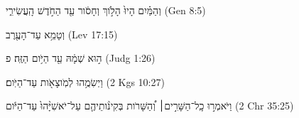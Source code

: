 
\begin{exe}

\ex\label{antdur_defdem_exs1}
\texthebrew{
וְהַמַּ֗יִם הָיוּ֙ הָלֹ֣וךְ וְחָסֹ֔ור עַ֖ד הַחֹ֣דֶשׁ הָֽעֲשִׂירִ֑י 
} (Gen 8:5)

\ex\label{antdur_defdem_exs2}
\texthebrew{
וְטָמֵ֥א עַד־הָעֶ֖רֶב 
} (Lev 17:15)

\ex\label{antdur_defdem_exs3}
\texthebrew{
ה֣וּא שְׁמָ֔הּ עַ֖ד הַיֹּ֥ום הַזֶּֽה׃ פ 
} (Judg 1:26)

\ex\label{antdur_defdem_exs4}
\texthebrew{
וַיְשִׂמֻ֥הוּ לְמֹֽוצָאֹ֖ות עַד־הַיֹּֽום׃ 
} (2 Kgs 10:27)

\ex\label{antdur_defdem_exs5}
\texthebrew{
וַיֹּאמְר֣וּ כָֽל־הַשָּׁרִ֣ים׀ וְ֠הַשָּׁרֹות בְּקִינֹ֨ותֵיהֶ֤ם עַל־יֹאשִׁיָּ֨הוּ֙ עַד־הַיֹּ֔ום 
} (2 Chr 35:25)

\end{exe}
